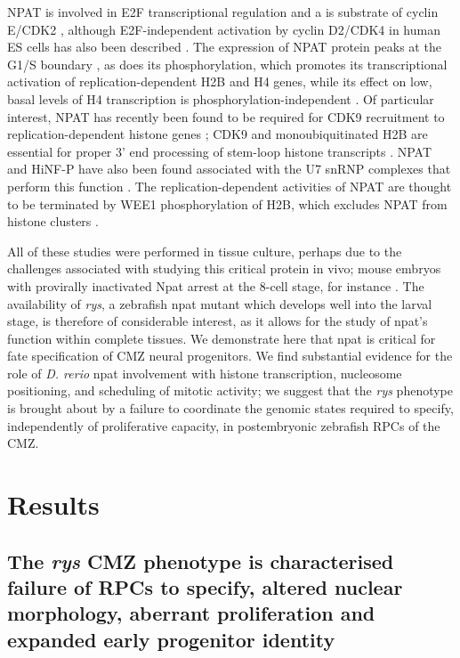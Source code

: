 \documentclass{ut-thesis}
\begin{document}
\begin{NoHyper}
NPAT is involved in E2F transcriptional regulation \cite{Gao2003} and a is substrate of cyclin E/CDK2 \cite{Zhao1998}, although E2F-independent activation by cyclin D2/CDK4 in human ES cells has also been described \cite{Becker2010}. The expression of NPAT protein peaks at the G1/S boundary \cite{Zhao1998}, as does its phosphorylation, which promotes its transcriptional activation of replication-dependent H2B \cite{Ma2000} and H4 \cite{Mitra2009} genes, while its effect on low, basal levels of H4 transcription is phosphorylation-independent \cite{Ye2003}. Of particular interest, NPAT has recently been found to be required for CDK9 recruitment to replication-dependent histone genes \cite{Pirngruber2010}; CDK9 and monoubiquitinated H2B are essential for proper 3’ end processing of stem-loop histone transcripts \cite{Pirngruber2009}. NPAT and HiNF-P have also been found associated with the U7 snRNP complexes that perform this function \cite{Ghule2009}. The replication-dependent activities of NPAT are thought to be terminated by WEE1 phosphorylation of H2B, which excludes NPAT from histone clusters \cite{Mahajan2012}.

All of these studies were performed in tissue culture, perhaps due to the challenges associated with studying this critical protein in vivo; mouse embryos with provirally inactivated Npat arrest at the 8-cell stage, for instance \cite{DiFruscio1997}. The availability of \textit{rys}, a zebrafish npat mutant which develops well into the larval stage, is therefore of considerable interest, as it allows for the study of npat’s function within complete tissues. We demonstrate here that npat is critical for fate specification of CMZ neural progenitors. We find substantial evidence for the role of \textit{D. rerio} npat involvement with histone transcription, nucleosome positioning, and scheduling of mitotic activity; we suggest that the \textit{rys} phenotype is brought about by a failure to coordinate the genomic states required to specify, independently of proliferative capacity, in postembryonic zebrafish RPCs of the CMZ.

\section{Results}
\subsection{The \textit{rys} CMZ phenotype is characterised failure of RPCs to specify, altered nuclear morphology, aberrant proliferation and expanded early progenitor identity}


\end{NoHyper}
\end{document}
